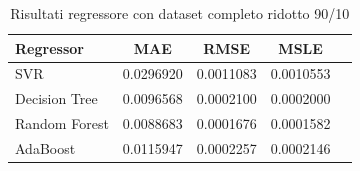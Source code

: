 \begin{table}[H]
    \centering
    \begin{tabular}{|>{\centering\arraybackslash}m{5cm}|c|c|c|c|}
        \hline
        \textbf{Regressor} & \textbf{MAE} & \textbf{RMSE} & \textbf{MSLE} \\ [10pt]
        \hline
        SVR & 0.0296920 & 0.0011083 & 0.0010553 \\ [10pt]
        \hline
        Decision Tree & 0.0096568 & 0.0002100 & 0.0002000 \\ [10pt]
        \hline
        Random Forest & 0.0088683 & 0.0001676 & 0.0001582 \\ [10pt]
        \hline
        AdaBoost & 0.0115947 & 0.0002257 & 0.0002146 \\ [10pt]
        \hline
    \end{tabular}
    \caption{Risultati regressore con dataset completo ridotto 90/10}
    \label{tab:results}
\end{table}


